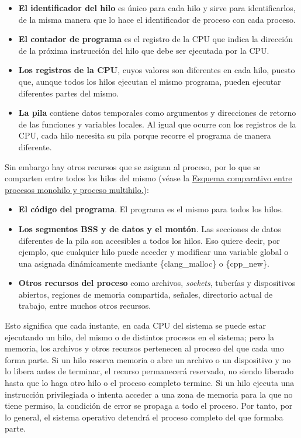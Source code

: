 \begin{itemize}
\item
  \textbf{El identificador del hilo} es único para cada hilo y sirve
  para identificarlos, de la misma manera que lo hace el identificador
  de proceso con cada proceso.
\item
  \textbf{El contador de programa} es el registro de la CPU que indica
  la dirección de la próxima instrucción del hilo que debe ser ejecutada
  por la CPU.
\item
  \textbf{Los registros de la CPU}, cuyos valores son diferentes en cada
  hilo, puesto que, aunque todos los hilos ejecutan el mismo programa,
  pueden ejecutar diferentes partes del mismo.
\item
  \textbf{La pila} contiene datos temporales como argumentos y
  direcciones de retorno de las funciones y variables locales. Al igual
  que ocurre con los registros de la CPU, cada hilo necesita su pila
  porque recorre el programa de manera diferente.
\end{itemize}

Sin embargo hay otros recursos que se asignan al proceso, por lo que se
comparten entre todos los hilos del mismo (véase la
\hyperref[fig-multihilo]{Esquema comparativo entre procesos monohilo y
proceso multihilo.}):

\begin{itemize}
\item
  \textbf{El código del programa}. El programa es el mismo para todos
  los hilos.
\item
  \textbf{Los segmentos BSS y de datos y el montón}. Las secciones de
  datos diferentes de la pila son accesibles a todos los hilos. Eso
  quiere decir, por ejemplo, que cualquier hilo puede acceder y
  modificar una variable global o una asignada dinámicamente mediante
  \{clang\_malloc\} o \{cpp\_new\}.
\item
  \textbf{Otros recursos del proceso} como archivos, \emph{sockets},
  tuberías y dispositivos abiertos, regiones de memoria compartida,
  señales, directorio actual de trabajo, entre muchos otros recursos.
\end{itemize}

Esto significa que cada instante, en cada CPU del sistema se puede estar
ejecutando un hilo, del mismo o de distintos procesos en el sistema;
pero la memoria, los archivos y otros recursos pertenecen al proceso del
que cada uno forma parte. Si un hilo reserva memoria o abre un archivo o
un dispositivo y no lo libera antes de terminar, el recurso permanecerá
reservado, no siendo liberado hasta que lo haga otro hilo o el proceso
completo termine. Si un hilo ejecuta una instrucción privilegiada o
intenta acceder a una zona de memoria para la que no tiene permiso, la
condición de error se propaga a todo el proceso. Por tanto, por lo
general, el sistema operativo detendrá el proceso completo del que
formaba parte.


